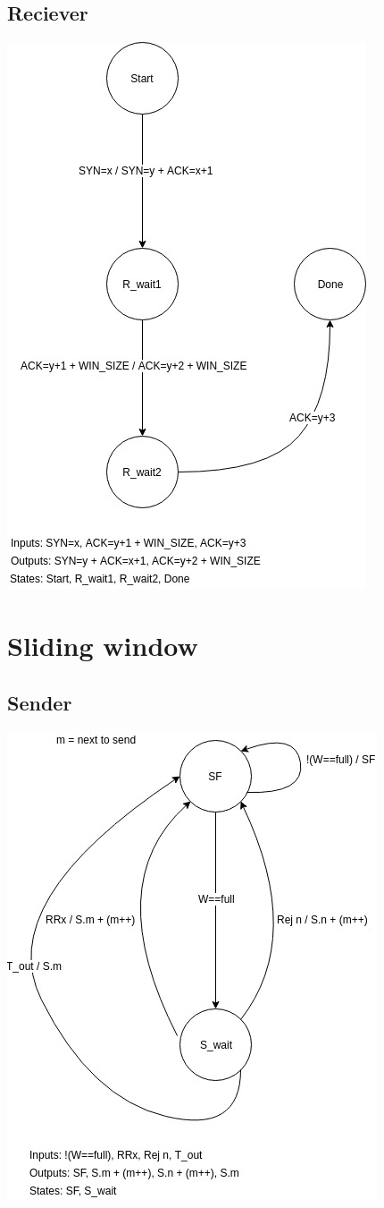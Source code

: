 \documentclass{article}
\begin{document}
\subsection{Reciever}
\includegraphics[scale=0.6]{TWH_R.jpg}
\section{Sliding window}
\subsection{Sender}
\includegraphics[scale=0.6]{SW_S.jpg}
\end{document}
